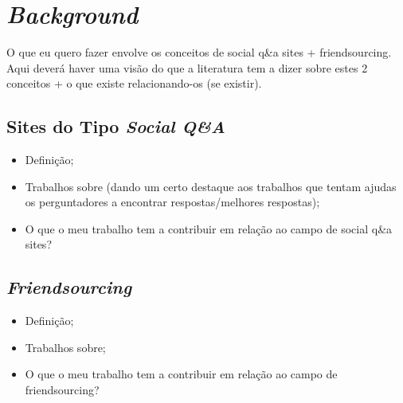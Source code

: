 \chapter{\textit{Background}}
O que eu quero fazer envolve os conceitos de social q\&a sites + friendsourcing. Aqui deverá haver uma visão do que a literatura tem a dizer sobre estes 2 conceitos + o que existe relacionando-os (se existir). 

\section{Sites do Tipo \textit{Social Q\&A}}
\begin{itemize}
  \item Definição;
  \item Trabalhos sobre (dando um certo destaque aos trabalhos que tentam ajudas os perguntadores a encontrar respostas/melhores respostas);
  \item O que o meu trabalho tem a contribuir em relação ao campo de social q\&a sites?
\end{itemize}
\section{\textit{Friendsourcing}}
\begin{itemize}
  \item Definição;
  \item Trabalhos sobre;
  \item O que o meu trabalho tem a contribuir em relação ao campo de friendsourcing?
\end{itemize}